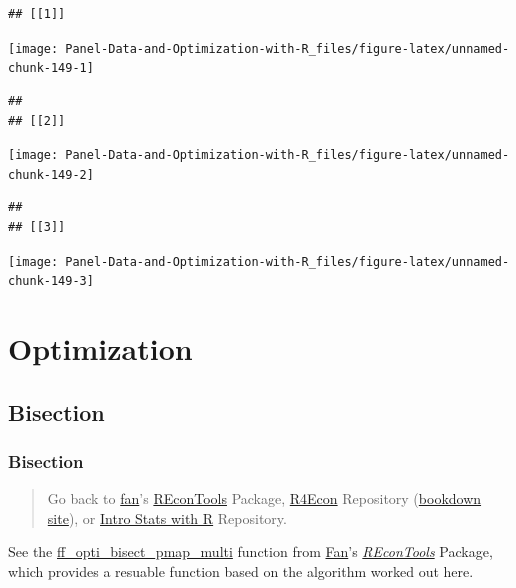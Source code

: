 \documentclass[
]{book}
\begin{document}
\begin{verbatim}
## [[1]]
\end{verbatim}

\begin{center}\texttt{[image: Panel-Data-and-Optimization-with-R\_files/figure-latex/unnamed-chunk-149-1]} \end{center}

\begin{verbatim}
## 
## [[2]]
\end{verbatim}

\begin{center}\texttt{[image: Panel-Data-and-Optimization-with-R\_files/figure-latex/unnamed-chunk-149-2]} \end{center}

\begin{verbatim}
## 
## [[3]]
\end{verbatim}

\begin{center}\texttt{[image: Panel-Data-and-Optimization-with-R\_files/figure-latex/unnamed-chunk-149-3]} \end{center}

\hypertarget{optimization}{%
\chapter{Optimization}\label{optimization}}

\hypertarget{bisection}{%
\section{Bisection}\label{bisection}}

\hypertarget{bisection-1}{%
\subsection{Bisection}\label{bisection-1}}

\begin{quote}
Go back to \href{http://fanwangecon.github.io/}{fan}'s \href{https://fanwangecon.github.io/REconTools/}{REconTools} Package, \href{https://fanwangecon.github.io/R4Econ/}{R4Econ} Repository (\href{https://fanwangecon.github.io/R4Econ/bookdown}{bookdown site}), or \href{https://fanwangecon.github.io/Stat4Econ/}{Intro Stats with R} Repository.
\end{quote}

See the \href{https://fanwangecon.github.io/REconTools/reference/ff_opti_bisect_pmap_multi.html}{ff\_opti\_bisect\_pmap\_multi} function from \href{https://fanwangecon.github.io/}{Fan}'s \emph{\href{https://fanwangecon.github.io/REconTools/}{REconTools}} Package, which provides a resuable function based on the algorithm worked out here.
\end{document}
